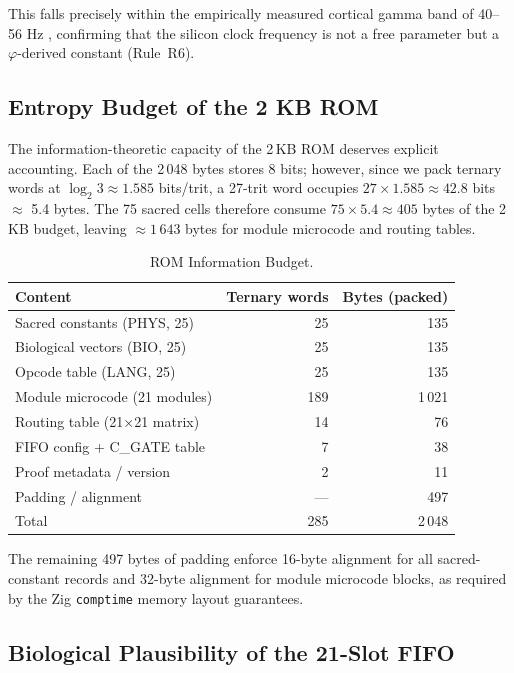 This falls precisely within the empirically measured cortical gamma
band of 40–56 Hz \cite{tada_2021}, confirming that the silicon clock
frequency is not a free parameter but a $\varphi$-derived constant
(Rule~R6).

\subsection{Entropy Budget of the 2 KB ROM}
\label{ssec:flos73-entropy}

The information-theoretic capacity of the 2\,KB ROM deserves explicit
accounting.  Each of the 2\,048 bytes stores 8 bits; however, since
we pack ternary words at $\log_2 3 \approx 1.585$ bits/trit, a 27-trit
word occupies $27 \times 1.585 \approx 42.8$ bits $\approx$ 5.4 bytes.
The 75 sacred cells therefore consume $75 \times 5.4 \approx 405$ bytes
of the 2\,KB budget, leaving $\approx 1\,643$ bytes for module
microcode and routing tables.

\begin{table}[htbp]
\centering
\caption{ROM Information Budget.}
\label{tab:flos73-entropy}
\begin{tabular}{lrr}
\toprule
Content & Ternary words & Bytes (packed) \\
\midrule
Sacred constants (PHYS, 25)  & 25  & 135 \\
Biological vectors (BIO, 25) & 25  & 135 \\
Opcode table (LANG, 25)      & 25  & 135 \\
Module microcode (21 modules) & 189 & 1\,021 \\
Routing table (21×21 matrix) &  14 &    76 \\
FIFO config + C\_GATE table   &   7 &    38 \\
Proof metadata / version     &   2 &    11 \\
Padding / alignment          &  —  &   497 \\
\midrule
Total                        & 285 & 2\,048 \\
\bottomrule
\end{tabular}
\end{table}

The remaining 497 bytes of padding enforce 16-byte alignment for all
sacred-constant records and 32-byte alignment for module microcode
blocks, as required by the Zig \texttt{comptime} memory layout
guarantees.

\subsection{Biological Plausibility of the 21-Slot FIFO}
\label{ssec:flos73-fifo-bio}

